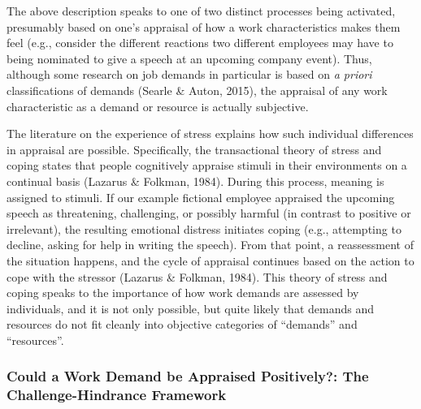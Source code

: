 \documentclass[
  man]{apa6}
\begin{document}
The above description speaks to one of two distinct processes being activated, presumably based on one's appraisal of how a work characteristics makes them feel (e.g., consider the different reactions two different employees may have to being nominated to give a speech at an upcoming company event). Thus, although some research on job demands in particular is based on \emph{a priori} classifications of demands (Searle \& Auton, 2015), the appraisal of any work characteristic as a demand or resource is actually subjective.

The literature on the experience of stress explains how such individual differences in appraisal are possible. Specifically, the transactional theory of stress and coping states that people cognitively appraise stimuli in their environments on a continual basis (Lazarus \& Folkman, 1984). During this process, meaning is assigned to stimuli. If our example fictional employee appraised the upcoming speech as threatening, challenging, or possibly harmful (in contrast to positive or irrelevant), the resulting emotional distress initiates coping (e.g., attempting to decline, asking for help in writing the speech). From that point, a reassessment of the situation happens, and the cycle of appraisal continues based on the action to cope with the stressor (Lazarus \& Folkman, 1984). This theory of stress and coping speaks to the importance of how work demands are assessed by individuals, and it is not only possible, but quite likely that demands and resources do not fit cleanly into objective categories of ``demands'' and ``resources''.

\hypertarget{could-a-work-demand-be-appraised-positively-the-challenge-hindrance-framework}{%
\subsubsection{Could a Work Demand be Appraised Positively?: The Challenge-Hindrance Framework}\label{could-a-work-demand-be-appraised-positively-the-challenge-hindrance-framework}}
\end{document}
